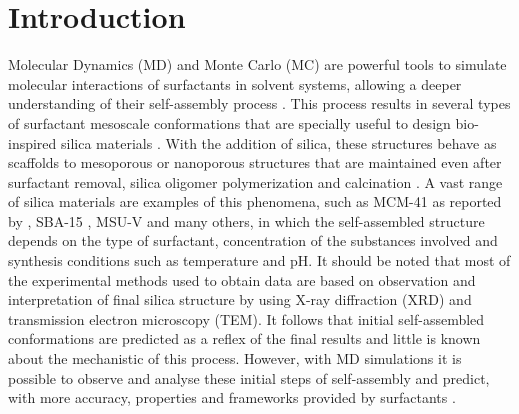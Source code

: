 \documentclass[10pt,a4paper,twoside]{article}
\begin{document}
\section{Introduction}
 
Molecular Dynamics (MD) and Monte Carlo (MC) are powerful tools to simulate molecular interactions of surfactants in solvent systems, allowing a deeper understanding of their self-assembly process \cite{mjsilica}. This process results in several types of surfactant mesoscale conformations that are specially useful to design bio-inspired silica materials \cite{bioinsp}. With the addition of silica, these structures behave as scaffolds to mesoporous or nanoporous structures that are maintained even after surfactant removal, silica oligomer polymerization and calcination \cite{silica1}.
A vast range of silica materials are examples of this phenomena, such as MCM-41 as reported by , SBA-15 \cite{sba}, MSU-V \cite{msuv} and many others, in which the self-assembled structure depends on the type of surfactant, concentration of the substances involved and synthesis conditions such as temperature and pH. It should be noted that most of the experimental methods used to obtain data are based on observation and interpretation of final silica structure by using X-ray diffraction (XRD) and transmission electron microscopy (TEM). It follows that initial self-assembled conformations are predicted as a reflex of the final results and little is known about the mechanistic of this process. However, with MD simulations it is possible to observe and analyse these initial steps of self-assembly and predict, with more accuracy, properties and frameworks provided by surfactants \cite{lipid}.
\end{document}

